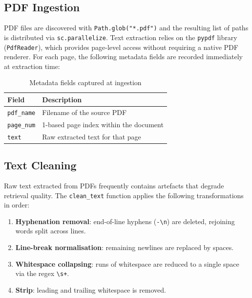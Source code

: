 \documentclass[a4paper,11pt]{article}
\begin{document}
\subsection{PDF Ingestion}

PDF files are discovered with \texttt{Path.glob("*.pdf")} and the resulting
list of paths is distributed via \texttt{sc.parallelize}. Text extraction
relies on the \texttt{pypdf} library (\texttt{PdfReader}), which provides
page-level access without requiring a native PDF renderer. For each page,
the following metadata fields are recorded immediately at extraction time:

\begin{table}[H]
  \centering
  \caption{Metadata fields captured at ingestion}
  \begin{tabularx}{\linewidth}{lX}
    \toprule
    \textbf{Field} & \textbf{Description} \\
    \midrule
    \texttt{pdf\_name}  & Filename of the source PDF \\
    \texttt{page\_num}  & 1-based page index within the document \\
    \texttt{text}       & Raw extracted text for that page \\
    \bottomrule
  \end{tabularx}
\end{table}

\subsection{Text Cleaning}

Raw text extracted from PDFs frequently contains artefacts that degrade
retrieval quality. The \texttt{clean\_text} function applies the following
transformations in order:

\begin{enumerate}[noitemsep]
  \item \textbf{Hyphenation removal}: end-of-line hyphens (\texttt{-\textbackslash n})
        are deleted, rejoining words split across lines.
  \item \textbf{Line-break normalisation}: remaining newlines are replaced by
        spaces.
  \item \textbf{Whitespace collapsing}: runs of whitespace are reduced to a
        single space via the regex \texttt{\textbackslash s+}.
  \item \textbf{Strip}: leading and trailing whitespace is removed.
\end{enumerate}
\end{document}
